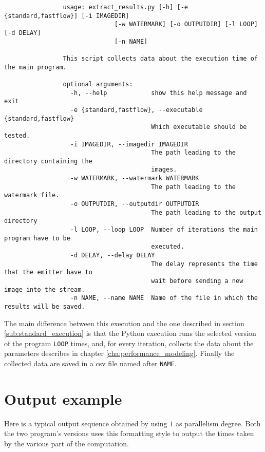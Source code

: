             \begin{verbatim}
                usage: extract_results.py [-h] [-e {standard,fastflow}] [-i IMAGEDIR]
                              [-w WATERMARK] [-o OUTPUTDIR] [-l LOOP] [-d DELAY]
                              [-n NAME]

                This script collects data about the execution time of the main program.

                optional arguments:
                  -h, --help            show this help message and exit
                  -e {standard,fastflow}, --executable {standard,fastflow}
                                        Which executable should be tested.
                  -i IMAGEDIR, --imagedir IMAGEDIR
                                        The path leading to the directory containing the
                                        images.
                  -w WATERMARK, --watermark WATERMARK
                                        The path leading to the watermark file.
                  -o OUTPUTDIR, --outputdir OUTPUTDIR
                                        The path leading to the output directory
                  -l LOOP, --loop LOOP  Number of iterations the main program have to be
                                        executed.
                  -d DELAY, --delay DELAY
                                        The delay represents the time that the emitter have to
                                        wait before sending a new image into the stream.
                  -n NAME, --name NAME  Name of the file in which the results will be saved.
            \end{verbatim}

            The main difference between this execution and the one described in section
            \ref{sub:standard_execution} is that the Python execution runs the selected version of the program
            \texttt{LOOP} times, and, for every iteration, collects the data about the parameters describes in
            chapter \ref{cha:performance_modeling}. Finally the collected data are saved in a csv file named
            after \texttt{NAME}.

    \section{Output example} %
    \label{sec:output_example}
        Here is a typical output sequence obtained by using $1$ as parallelism degree. Both the two program's
        versions uses this formatting style to output the times taken by the various part of the computation.


